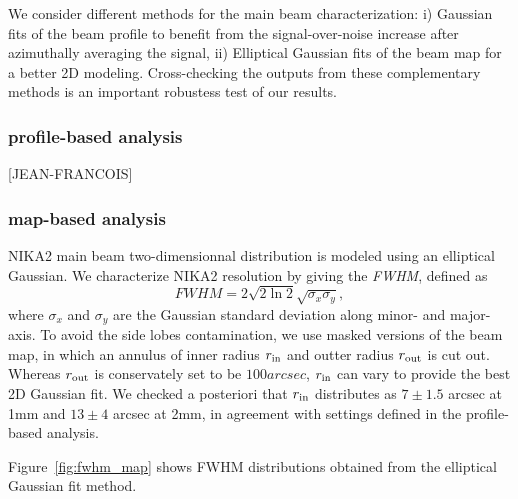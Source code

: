   
We consider different methods for the main beam characterization: i) Gaussian fits of the beam profile to benefit from the signal-over-noise increase after azimuthally averaging the signal, ii) Elliptical Gaussian fits of the beam map for a better 2D modeling. Cross-checking the outputs from these complementary methods is an important robustess test of our results.   


\subsubsection{profile-based analysis}

[JEAN-FRANCOIS]

\subsubsection{map-based analysis}

NIKA2 main beam two-dimensionnal distribution is modeled using an elliptical Gaussian. We characterize NIKA2 resolution by giving the \emph{FWHM}, defined as
\begin{equation}
  FWHM = 2 \sqrt{2\ln {2}} \sqrt{\sigma_x\sigma_y},
\end{equation}
where $\sigma_x$ and $\sigma_y$ are the Gaussian standard deviation along minor- and major-axis. To avoid the side lobes contamination, we use masked versions of the beam map, in which an annulus of inner radius $r_{\rm{in}}$ and outter radius $r_{\rm{out}}$ is cut out. Whereas $r_{\rm{out}}$ is conservately set to be $100 arcsec$, $r_{\rm{in}}$ can vary to provide the best 2D Gaussian fit. We checked a posteriori that $r_{\rm{in}}$ distributes as $7 \pm 1.5$ arcsec at 1mm and $13 \pm 4$ arcsec at 2mm, in agreement with settings defined in the profile-based analysis.   

Figure~\ref{fig:fwhm_map} shows FWHM distributions obtained from the elliptical Gaussian fit method.



